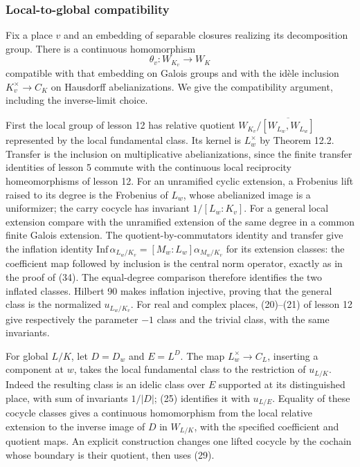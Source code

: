 \documentclass[11pt,a4paper]{article}
\begin{document}
\subsubsection{Local-to-global
compatibility}\label{local-to-global-compatibility}

Fix a place \(v\) and an embedding of separable closures realizing its
decomposition group. There is a continuous homomorphism \[
\theta_v:W_{K_v}\longrightarrow W_K
\tag{37}
\] compatible with that embedding on Galois groups and with the idèle
inclusion \(K_v^\times\to C_K\) on Hausdorff abelianizations. We give
the compatibility argument, including the inverse-limit choice.

First the local group of lesson 12 has relative quotient
\(W_{K_v}/\overline{[W_{L_w},W_{L_w}]}\) represented by the local
fundamental class. Its kernel is \(L_w^\times\) by Theorem 12.2.
Transfer is the inclusion on multiplicative abelianizations, since the
finite transfer identities of lesson 5 commute with the continuous local
reciprocity homeomorphisms of lesson 12. For an unramified cyclic
extension, a Frobenius lift raised to its degree is the Frobenius of
\(L_w\), whose abelianized image is a uniformizer; the carry cocycle has
invariant \(1/[L_w:K_v]\). For a general local extension compare with
the unramified extension of the same degree in a common finite Galois
extension. The quotient-by-commutators identity and transfer give the
inflation identity
\(\mathrm{Inf}\,\alpha_{L_w/K_v}=[M_w:L_w]\alpha_{M_w/K_v}\) for its
extension classes: the coefficient map followed by inclusion is the
central norm operator, exactly as in the proof of (34). The equal-degree
comparison therefore identifies the two inflated classes. Hilbert 90
makes inflation injective, proving that the general class is the
normalized \(u_{L_w/K_v}\). For real and complex places, (20)--(21) of
lesson 12 give respectively the parameter \(-1\) class and the trivial
class, with the same invariants.

For global \(L/K\), let \(D=D_w\) and \(E=L^D\). The map
\(L_w^\times\to C_L\), inserting a component at \(w\), takes the local
fundamental class to the restriction of \(u_{L/K}\). Indeed the
resulting class is an idelic class over \(E\) supported at its
distinguished place, with sum of invariants \(1/|D|\); (25) identifies
it with \(u_{L/E}\). Equality of these cocycle classes gives a
continuous homomorphism from the local relative extension to the inverse
image of \(D\) in \(W_{L/K}\), with the specified coefficient and
quotient maps. An explicit construction changes one lifted cocycle by
the cochain whose boundary is their quotient, then uses (29).
\end{document}
